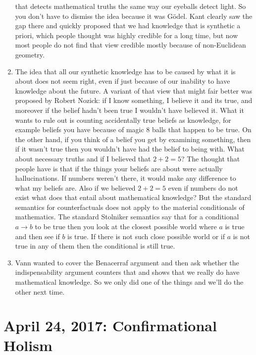 \documentclass[12pt]{article}
\theoremstyle{definition}
\begin{document}
\begin{enumerate}
        that detects mathematical truths the same way our eyeballs detect
        light. So you don't have to dismiss the idea because it was G\"odel.
        Kant clearly saw the gap there and quickly proposed that we had
        knowledge that is synthetic a priori, which people thought was highly
        credible for a long time, but now most people do not find that view
        credible mostly because of non-Euclidean geometry.
    \item
        The idea that all our synthetic knowledge has to be caused by what it
        is about does not seem right, even if just because of our inability to
        have knowledge about the future. A variant of that view that might fair
        better was proposed by Robert Nozick: if I know something, I believe it
        and its true, and moreover if the belief hadn't been true I wouldn't
        have believed it. What it wants to rule out is counting accidentally
        true beliefs as knowledge, for example beliefs you have because of
        magic 8 balls that happen to be true. On the other hand, if you think
        of a belief you get by examining something, then if it wasn't true then
        you wouldn't have had the belief to being with. What about necessary
        truths and if I believed that $2 + 2 = 5$? The thought that people have
        is that if the things your beliefs are about were actually
        hallucinations. If numbers weren't there, it would make any difference
        to what my beliefs are. Also if we believed $2 + 2 = 5$ even if numbers
        do not exist what does that entail about mathematical knowledge? But
        the standard semantics for counterfactuals does not apply to the
        material conditionals of mathematics. The standard Stolniker semantics
        say that for a conditional $a \rightarrow b$ to be  true then you look
        at the closest possible world where $a$ is true and then see if $b$ is
        true. If there is not such close possible world or if $a$ is not true
        in any of them then the conditional is still true.
    \item
        Vann wanted to cover the Benacerraf argument and then ask whether the
        indispensability argument counters that and shows that we really do
        have mathematical knowledge. So we only did one of the things and we'll
        do the other next time.
\end{enumerate}

\section{April 24, 2017: Confirmational Holism}
\end{document}
